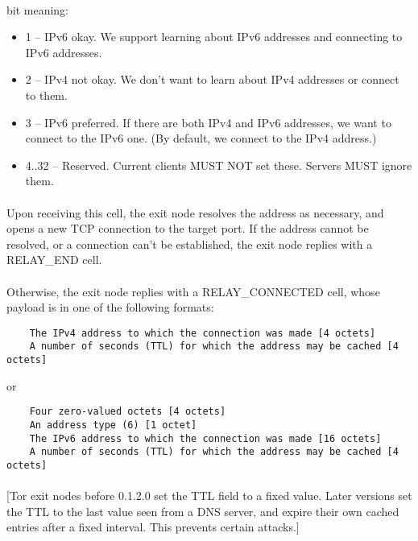 \paragraph{}
bit meaning:
\begin{itemize}
    \item 1 -- IPv6 okay. We support learning about IPv6 addresses and
    connecting to IPv6 addresses.
    \item 2 -- IPv4 not okay. We don't want to learn about IPv4 addresses
    or connect to them.
    \item 3 -- IPv6 preferred. If there are both IPv4 and IPv6 addresses,
    we want to connect to the IPv6 one. (By default, we connect
    to the IPv4 address.)
    \item 4..32 -- Reserved. Current clients MUST NOT set these. Servers
    MUST ignore them.
\end{itemize}

\paragraph{}
Upon receiving this cell, the exit node resolves the address as
necessary, and opens a new TCP connection to the target port. If the
address cannot be resolved, or a connection can't be established, the
exit node replies with a RELAY\_END cell.

\paragraph{}
Otherwise, the exit node replies with a RELAY\_CONNECTED cell, whose
payload is in one of the following formats:
\begin{verbatim}
    The IPv4 address to which the connection was made [4 octets]
    A number of seconds (TTL) for which the address may be cached [4 octets]
\end{verbatim}
or
\begin{verbatim}
    Four zero-valued octets [4 octets]
    An address type (6) [1 octet]
    The IPv6 address to which the connection was made [16 octets]
    A number of seconds (TTL) for which the address may be cached [4 octets]
\end{verbatim}

\paragraph{}
[Tor exit nodes before 0.1.2.0 set the TTL field to a fixed value. Later
versions set the TTL to the last value seen from a DNS server, and expire
their own cached entries after a fixed interval. This prevents certain
attacks.]


